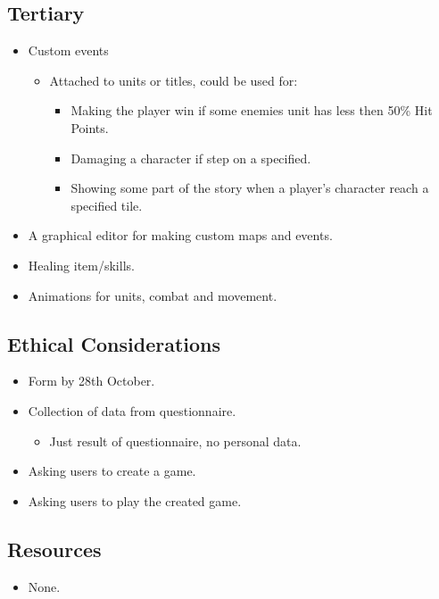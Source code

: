\subsection{Tertiary} \label{tertiary}
\begin{itemize}
	\item Custom events
	\begin{itemize}
		\item Attached to units or titles, could be used for:
		\begin{itemize}
			\item Making the player win if some enemies unit has less then 50\% Hit Points.
			
			\item Damaging a character if step on a specified.
			
			\item Showing some part of the story when a player's character reach a specified tile.
		\end{itemize}
	\end{itemize}
	
	\item A graphical editor for making custom maps and events.
	
	\item Healing item\slash skills.
	
	\item Animations for units, combat and movement.
\end{itemize}

\subsection{Ethical Considerations} \label{ethicalconsiderations}
\begin{itemize}
	\item Form by 28th October.
	
	\item Collection of data from questionnaire.
	\begin{itemize}
		\item Just result of questionnaire, no personal data.
	\end{itemize}
	
	\item Asking users to create a game.
	
	\item Asking users to play the created game.
\end{itemize}

\subsection{Resources} \label{resources}
\begin{itemize}
	\item None.
\end{itemize}



